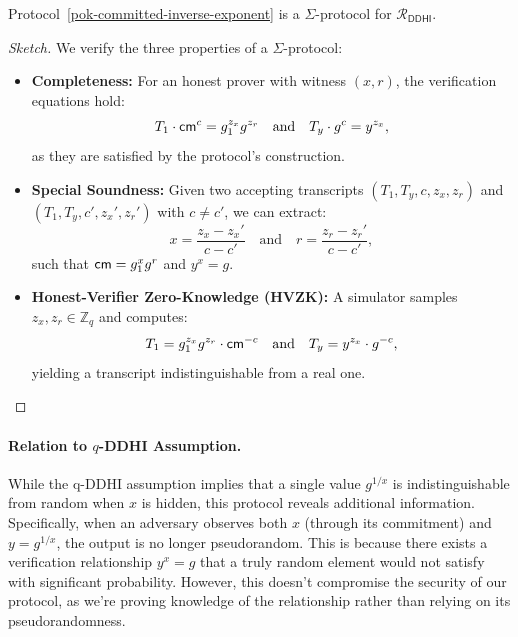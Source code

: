 \begin{theorem}
Protocol~\ref{pok-committed-inverse-exponent} is a $\Sigma$-protocol for $\mathcal{R}_{\mathsf{DDHI}}$.
\end{theorem}

\begin{proof}[Sketch]
We verify the three properties of a $\Sigma$-protocol:

\begin{itemize}
    \item \textbf{Completeness:} For an honest prover with witness $(x, r)$, the verification equations hold:
          $$T_1 \cdot \mathsf{cm}^c = g_1^{z_x} g^{z_r} \quad \text{and} \quad T_y \cdot g^c = y^{z_x},$$
          as they are satisfied by the protocol's construction.
    
    \item \textbf{Special Soundness:} Given two accepting transcripts $(T_1, T_y, c, z_x, z_r)$ and $(T_1, T_y, c', z_x', z_r')$ with $c \neq c'$, we can extract:
          $$x = \frac{z_x - z_x'}{c - c'} \quad \text{and} \quad r = \frac{z_r - z_r'}{c - c'},$$
          such that $\mathsf{cm} = g_1^x g^r$ and $y^x = g$.
    
    \item \textbf{Honest-Verifier Zero-Knowledge (HVZK):} A simulator samples $z_x, z_r \in \mathbb{Z}_q$ and computes:
          $$T_1 = g_1^{z_x} g^{z_r} \cdot \mathsf{cm}^{-c} \quad \text{and} \quad T_y = y^{z_x} \cdot g^{-c},$$
          yielding a transcript indistinguishable from a real one.
\end{itemize}
\end{proof}

\paragraph{Relation to $q$-DDHI Assumption.}  
While the q-DDHI assumption implies that a single value $g^{1/x}$ is indistinguishable from random when $x$ is hidden, 
this protocol reveals additional information. Specifically, when an adversary observes both $x$ (through its commitment) 
and $y = g^{1/x}$, the output is no longer pseudorandom. This is because there exists a verification relationship $y^x = g$ 
that a truly random element would not satisfy with significant probability. However, this doesn't compromise the 
security of our protocol, as we're proving knowledge of the relationship rather than relying on its pseudorandomness.

















